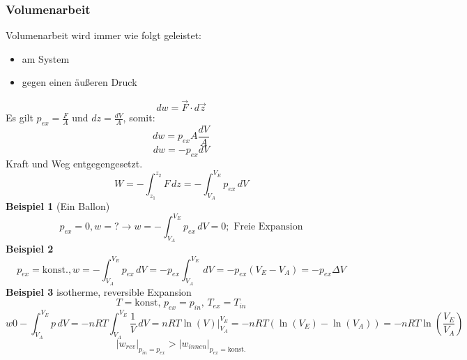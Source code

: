 \documentclass[a4paper]{article}
\begin{document}
\subsubsection{Volumenarbeit}
Volumenarbeit wird immer wie folgt geleistet:
\begin{itemize}
    \item am System
    \item gegen einen äußeren Druck
\end{itemize}
\begin{equation*}
    dw = \vec{F} \cdot d\vec{z}
\end{equation*}
Es gilt $p_{ex} = \frac{F}{A}$ und $dz = \frac{dV}{A}$, somit:
\begin{equation*}
    dw = p_{ex}A \frac{dV}{A}
\end{equation*}
\begin{equation*}
    dw = -p_{ex} dV
\end{equation*}
Kraft und Weg entgegengesetzt.
\begin{equation*}
    W = - \int_{z_1}^{z_2} F\,dz = - \int_{V_A}^{V_E} p_{ex} \,dV 
\end{equation*}
\textbf{Beispiel 1} (Ein Ballon)
\begin{equation*}
    p_{ex} = 0, w = ? \rightarrow w = - \int_{V_A}^{V_E} p_{ex} \, dV = 0; \text{ Freie Expansion}
\end{equation*}
\textbf{Beispiel 2}
\begin{equation*}
    p_{ex} = \text{konst.}, w = -\int_{V_A}^{V_E} p_{ex} \, dV = - p_{ex} \int_{V_A}^{V_E} \, dV = -p_{ex}(V_E-V_A) = -p_{ex}\Delta V
\end{equation*}
\textbf{Beispiel 3} isotherme, reversible Expansion
\begin{equation*}
    T = \text{konst},\,p_{ex}=p_{in},\,T_{ex} = T_{in}
\end{equation*}
\begin{equation*}
    w0-\int_{V_A}^{V_E}p\,dV = -nRT \int_{V_A}^{V_E} \frac{1}{V} \,dV = nRT \ln(V) \vert_{V_A}^{V_E} = -nRT(\ln(V_E)-\ln(V_A)) = -nRT\ln\left(\frac{V_E}{V_A}\right)
\end{equation*}
\begin{equation*}
    |w_{rev}|_{p_{in} = p_{ex}} > |w_{innen}|_{p_{ex}=\text{konst.}}
\end{equation*}
\end{document}
